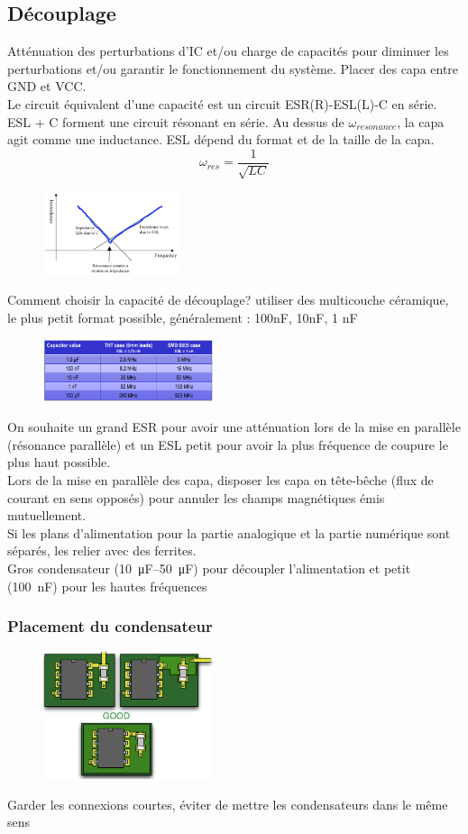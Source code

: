 \documentclass[resume]{subfiles}
\begin{document}
\begin{multicols}{3}
\subsection{Découplage}
Atténuation des perturbations d'IC et/ou charge de capacités pour diminuer les perturbations et/ou garantir le fonctionnement du système. Placer des capa entre GND et VCC.\\
Le circuit équivalent d'une capacité est un circuit ESR(R)-ESL(L)-C en série. ESL + C forment une circuit résonant en série. Au dessus de $\omega_{resonance}$, la capa agit comme une inductance. ESL dépend du format et de la taille de la capa.\\
$$\omega_{res}=\frac{1}{\sqrt{LC}}$$
\begin{figure}[H]
\centering
\includegraphics[width=4.00cm]{img_7.png}
\end{figure}
Comment choisir la capacité de découplage? utiliser des multicouche céramique, le plus petit format possible, généralement : 100nF, 10nF, 1 nF\\
\begin{figure}[H]
\centering
\includegraphics[width=5.00cm]{img_8.png}
\end{figure}
On souhaite un grand ESR pour avoir une atténuation lors de la mise en parallèle (résonance parallèle) et un ESL petit pour avoir la plus fréquence de coupure le plus haut possible.\\
Lors de la mise en parallèle des capa, disposer les capa en tête-bêche (flux de courant en sens opposés) pour annuler les champs magnétiques émis mutuellement.\\
Si les plans d'alimentation pour la partie analogique et la partie numérique sont séparés, les relier avec des ferrites.\\
Gros condensateur (\SIrange{10}{50}{\micro\farad}) pour découpler l'alimentation et petit (\SI{100}{\nano\farad}) pour les hautes fréquences
\subsubsection{Placement du condensateur}
\begin{figure}[H]
\centering
\includegraphics[width=5.00cm]{img_9.png}
\end{figure}
Garder les connexions courtes, éviter de mettre les condensateurs dans le même sens

\end{multicols}
\end{document}

